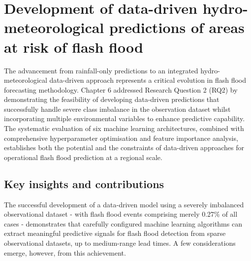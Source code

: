 \section{Development of data-driven hydro-meteorological predictions of areas at risk of flash flood}

The advancement from rainfall-only predictions to an integrated hydro-meteorological data-driven approach represents a critical evolution in flash flood forecasting methodology. Chapter 6 addressed Research Question 2 (RQ2) by demonstrating the feasibility of developing data-driven predictions that successfully handle severe class imbalance in the observation dataset whilst incorporating multiple environmental variables to enhance predictive capability. The systematic evaluation of six machine learning architectures, combined with comprehensive hyperparameter optimisation and feature importance analysis, establishes both the potential and the constraints of data-driven approaches for operational flash flood prediction at a regional scale.

\subsection{Key insights and contributions}

The successful development of a data-driven model using a severely imbalanced observational dataset - with flash flood events comprising merely 0.27\% of all cases - demonstrates that carefully configured machine learning algorithms can extract meaningful predictive signals for flash flood detection from sparse observational datasets, up to medium-range lead times. A few considerations emerge, however, from this achievement.

